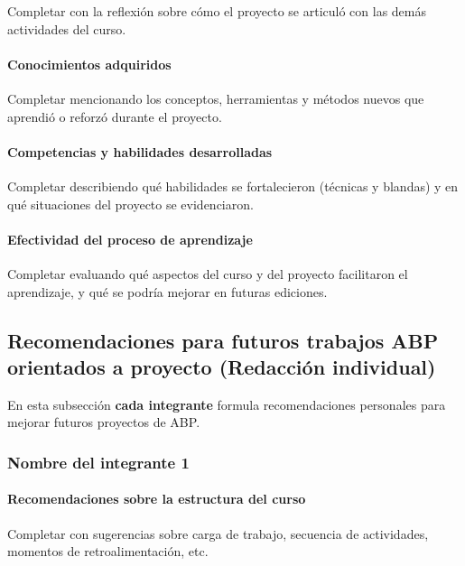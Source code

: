 \documentclass[11pt,a4paper]{article}
\begin{document}
Completar con la reflexión sobre cómo el proyecto se articuló con las demás
actividades del curso.

\paragraph{Conocimientos adquiridos}

Completar mencionando los conceptos, herramientas y métodos nuevos que
aprendió o reforzó durante el proyecto.

\paragraph{Competencias y habilidades desarrolladas}

Completar describiendo qué habilidades se fortalecieron (técnicas y blandas)
y en qué situaciones del proyecto se evidenciaron.

\paragraph{Efectividad del proceso de aprendizaje}

Completar evaluando qué aspectos del curso y del proyecto facilitaron el
aprendizaje, y qué se podría mejorar en futuras ediciones.

\subsection{Recomendaciones para futuros trabajos ABP orientados a proyecto (Redacción individual)}
\label{subsec:recomendaciones_abp}

En esta subsección \textbf{cada integrante} formula recomendaciones personales
para mejorar futuros proyectos de ABP.

\subsubsection*{Nombre del integrante 1}

\paragraph{Recomendaciones sobre la estructura del curso}
Completar con sugerencias sobre carga de trabajo, secuencia de actividades,
momentos de retroalimentación, etc.
\end{document}
